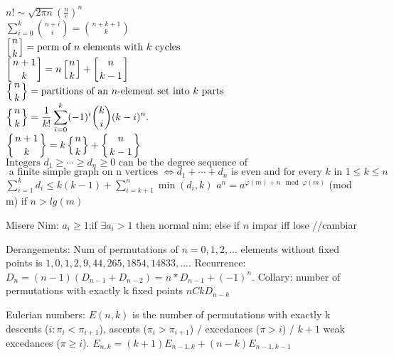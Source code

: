 $\displaystyle n!\sim {\sqrt {2\pi n}}\left({\frac {n}{e}}\right)^{n}$ \\
$\displaystyle \sum \limits_{i= 0}^k{n+i \choose i} = {n+k+1 \choose k}$ \\
${\displaystyle \left[{n \atop k}\right]} =\text{perm of }n \text{ elements with } k \text{ cycles}$ \\
${\displaystyle \left[{n+1 \atop k}\right]=n\left[{n \atop k}\right]+\left[{n \atop k-1}\right]}$ \\
${\displaystyle \left\{{n \atop k}\right\}}= \text{partitions of an }n\text{-element set into } k \text{ parts}$ \\
${\displaystyle \left\{{n \atop k}\right\}={\frac {1}{k!}}\sum _{i=0}^{k}(-1)^{i}{\binom {k}{i}}(k-i)^{n}.}$ \\
${\displaystyle \left\{{n+1 \atop k}\right\}=k\left\{{n \atop k}\right\}+\left\{{n \atop k-1}\right\}}$ \\
$\text {Integers } d_{1}\geq \cdots \geq d_{n} \geq 0 \text { can be the degree sequence of }$ \\
$\text { a finite simple graph on n vertices }\iff d_{1}+\cdots +d_{n} \text { is even and for every } k \text { in } 1\leq k\leq n $ \\
${\displaystyle \sum _{i=1}^{k}d_{i}\leq k(k-1)+\sum _{i=k+1}^{n}\min(d_{i},k)}$
$a^n = a^{\varphi(m)+n \mod \varphi(m)}$ (mod m) if $n > lg(m)$

Misere Nim: $a_i\geq 1$;if $\exists a_i > 1$ then normal nim; else if $n$ impar iff lose //cambiar

Derangements: Num of permutations of $n=0,1,2,...$ elements without fixed points is
$1,0,1,2,9,44,265,1854,14833,...$. Recurrence: $D_n = (n-1)(D_{n-1}+D_{n-2}) = n*D_{n-1}+(-1)^n$.
Collary: number of permutations with exactly k fixed points $nCk D_{n-k}$

Eulerian numbers: $E(n,k)$ is the number of permutations with exactly k descents ($i:\pi_{i} < \pi_{i+1}$),
ascents ($\pi_i > \pi_{i+1}$) / excedances ($\pi > i$) / $k+1$ weak excedances ($\pi \geq i$).
$E_{n,k} = (k+1)E_{n-1,k} + (n-k)E_{n-1,k-1}$
